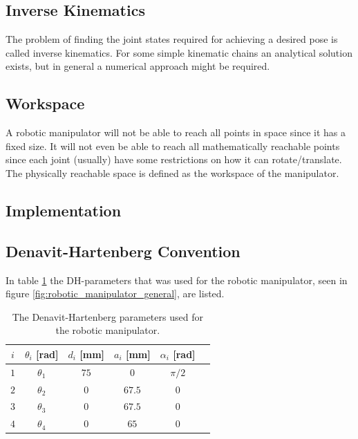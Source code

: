 \subsection*{Inverse Kinematics}
The problem of finding the joint states required for achieving a desired pose is called inverse kinematics. For some simple kinematic chains an analytical solution exists, but in general a numerical approach might be required. 






\subsection*{Workspace}
A robotic manipulator will not be able to reach all points in space since it has a fixed size. It will not even be able to reach all mathematically reachable points since each joint (usually) have some restrictions on how it can rotate/translate. The physically reachable space is defined as the workspace of the manipulator. %
\\




\subsection*{Implementation}

\subsection*{Denavit-Hartenberg Convention}
In table \ref{tab:DH-table} the DH-parameters that was used for the robotic manipulator, seen in figure \ref{fig:robotic_manipulator_general}, are listed.
\begin{table}[H]
    \centering
    \caption{The Denavit-Hartenberg parameters used for the robotic manipulator.}
    \begin{tabular}{c | c c c c c}
        \(i\) & \(\theta_i\) [rad] & \(d_i\) [mm] & \(a_i\) [mm] & \(\alpha_i\) [rad] \\
        \hline
        \(1\) & \(\theta_1\) & \(75\) & \(0\) & \(\pi / 2\) \\
        \(2\) & \(\theta_2\) & \(0\) & \(67.5\) & \(0\) \\
        \(3\) & \(\theta_3\) & \(0\) & \(67.5\) & \(0\) \\
        \(4\) & \(\theta_4\) & \(0\) & \(65\) & \(0\) \\
    \end{tabular}
    \label{tab:DH-table}
\end{table}



